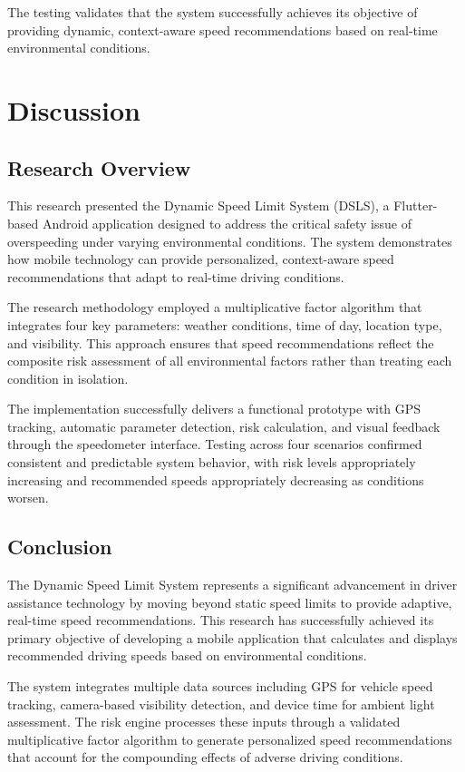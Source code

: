 The testing validates that the system successfully achieves its objective of providing dynamic, context-aware speed recommendations based on real-time environmental conditions.

\chapter{Discussion}\label{chapter:Discuss}
\section{Research Overview}
This research presented the Dynamic Speed Limit System (DSLS), a Flutter-based Android application designed to address the critical safety issue of overspeeding under varying environmental conditions. The system demonstrates how mobile technology can provide personalized, context-aware speed recommendations that adapt to real-time driving conditions.

The research methodology employed a multiplicative factor algorithm that integrates four key parameters: weather conditions, time of day, location type, and visibility. This approach ensures that speed recommendations reflect the composite risk assessment of all environmental factors rather than treating each condition in isolation.

The implementation successfully delivers a functional prototype with GPS tracking, automatic parameter detection, risk calculation, and visual feedback through the speedometer interface. Testing across four scenarios confirmed consistent and predictable system behavior, with risk levels appropriately increasing and recommended speeds appropriately decreasing as conditions worsen.

\section{Conclusion}
The Dynamic Speed Limit System represents a significant advancement in driver assistance technology by moving beyond static speed limits to provide adaptive, real-time speed recommendations. This research has successfully achieved its primary objective of developing a mobile application that calculates and displays recommended driving speeds based on environmental conditions.

The system integrates multiple data sources including GPS for vehicle speed tracking, camera-based visibility detection, and device time for ambient light assessment. The risk engine processes these inputs through a validated multiplicative factor algorithm to generate personalized speed recommendations that account for the compounding effects of adverse driving conditions.

